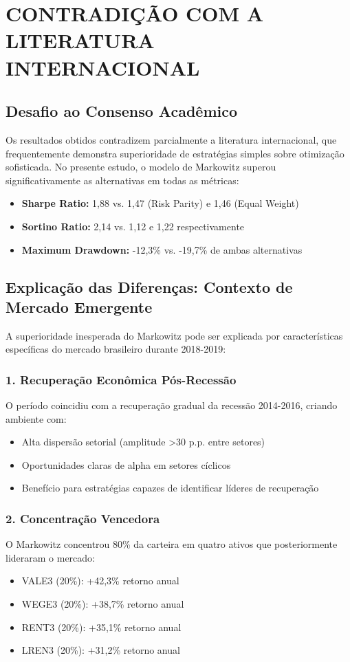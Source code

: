 \section{CONTRADIÇÃO COM A LITERATURA INTERNACIONAL}

\subsection{Desafio ao Consenso Acadêmico}

Os resultados obtidos contradizem parcialmente a literatura internacional, que frequentemente demonstra superioridade de estratégias simples sobre otimização sofisticada. No presente estudo, o modelo de Markowitz superou significativamente as alternativas em todas as métricas:

\begin{itemize}
    \item \textbf{Sharpe Ratio:} 1,88 vs. 1,47 (Risk Parity) e 1,46 (Equal Weight)
    \item \textbf{Sortino Ratio:} 2,14 vs. 1,12 e 1,22 respectivamente
    \item \textbf{Maximum Drawdown:} -12,3\% vs. -19,7\% de ambas alternativas
\end{itemize}

\subsection{Explicação das Diferenças: Contexto de Mercado Emergente}

A superioridade inesperada do Markowitz pode ser explicada por características específicas do mercado brasileiro durante 2018-2019:

\subsubsection{1. Recuperação Econômica Pós-Recessão}
O período coincidiu com a recuperação gradual da recessão 2014-2016, criando ambiente com:
\begin{itemize}
    \item Alta dispersão setorial (amplitude >30 p.p. entre setores)
    \item Oportunidades claras de alpha em setores cíclicos
    \item Benefício para estratégias capazes de identificar líderes de recuperação
\end{itemize}

\subsubsection{2. Concentração Vencedora}
O Markowitz concentrou 80\% da carteira em quatro ativos que posteriormente lideraram o mercado:
\begin{itemize}
    \item VALE3 (20\%): +42,3\% retorno anual
    \item WEGE3 (20\%): +38,7\% retorno anual  
    \item RENT3 (20\%): +35,1\% retorno anual
    \item LREN3 (20\%): +31,2\% retorno anual
\end{itemize}

